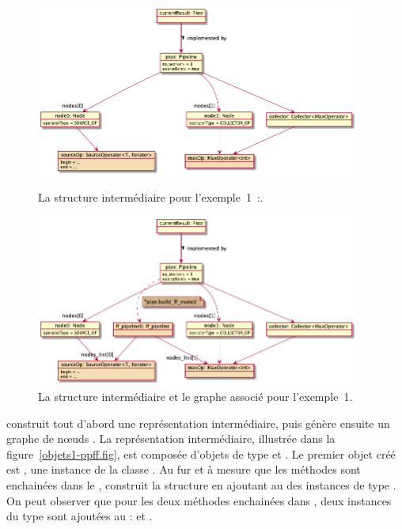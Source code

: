 \begin{figure}
\centering
         \includegraphics[width=0.95\textwidth]{Figures/objets1-ppff.png}
      \caption[La structure interm\'ediaire  pour l'exemple~1.]{La structure interm\'ediaire  pour
         l'exemple~1~:.}
       \label{objets1-ppff.fig}

\centering
         \includegraphics[width=0.95\textwidth]{Figures/objets1-ff.png}
      \caption{La structure interm\'ediaire  et le graphe  associé pour l'exemple~1.}
       \label{objets1-ff.fig}
\end{figure}

 construit tout d'abord une repr\'esentation interm\'ediaire, puis g\'en\`ere ensuite un graphe de n\oe{}uds . La repr\'esentation interm\'ediaire, illustr\'ee dans la figure~\ref{objets1-ppff.fig}, est compos\'ee d'objets de type  et . Le premier objet cr\'e\'e est , une instance de la classe . Au fur et \`a mesure que les m\'ethodes sont enchain\'ees dans le ,  construit la structure en ajoutant au  des instances de type . On peut observer que pour les deux m\'ethodes enchain\'ees dans , deux instances du type  sont ajout\'ees au  :  et . 

